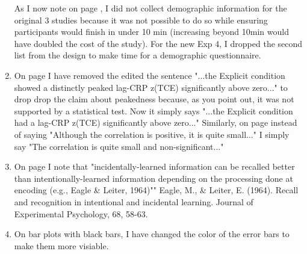 \documentclass[12pt]{article}
\begin{document}
\begin{enumerate}
	As I now note on page \pageref{TODO-10}, I did not collect demographic information for the original 3 studies because it was not possible to do so while ensuring participants would finish in under 10 min (increasing beyond 10min would have doubled the cost of the study). For the new Exp 4, I dropped the second list from the design to make time for a demographic questionnaire. %

\item
	On page \pageref{done-11} I have removed the edited the sentence "...the Explicit condition showed a distinctly peaked lag-CRP z(TCE) significantly above zero..." to drop drop the claim about peakedness because, as you point out, it was not supported by a statistical test. Now it simply says "...the Explicit condition had a lag-CRP z(TCE) significantly above zero..."
	Similarly, on page \pageref{done-12} instead of saying "Although the correlation is positive, it is quite small..." I simply say "The correlation is quite small and non-significant..."

\item
	On page \pageref{TODO-13} I note that "incidentally-learned information can be recalled better than intentionally-learned information depending on the processing done at encoding (e.g., Eagle \& Leiter, 1964)""
	Eagle, M., \& Leiter, E. (1964). Recall and recognition in intentional and incidental learning. Journal of Experimental Psychology, 68, 58-63.

\item
	\pageref{TODO-14} On bar plots with black bars, I have changed the color of the error bars to make them more visiable. 


\end{enumerate}
\end{document}
